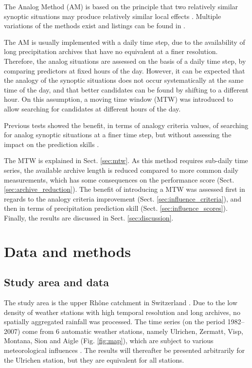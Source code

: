 \documentclass[hess, manuscript]{copernicus}
\begin{document}
\introduction  %
\label{sec:introduction}

The Analog Method (AM) is based on the principle that two relatively similar synoptic situations may produce relatively similar local effects \citep{Lorenz1956, Lorenz1969}. Multiple variations of the methods exist and listings can be found in \citet{BenDaoud2016}.

The AM is usually implemented with a daily time step, due to the availability of long precipitation archives that have no equivalent at a finer resolution. Therefore, the analog situations are assessed on the basis of a daily time step, by comparing predictors at fixed hours of the day. However, it can be expected that the analogy of the synoptic situations does not occur systematically at the same time of the day, and that better candidates can be found by shifting to a different hour. On this assumption, a moving time window (MTW) was introduced to allow searching for candidates at different hours of the day.

Previous tests showed the benefit, in terms of analogy criteria values, of searching for analog synoptic situations at a finer time step, but without assessing the impact on the prediction skills \citep{Finet2008}. 


The MTW is explained in Sect. \ref{sec:mtw}. As this method requires sub-daily time series, the available archive length is reduced compared to more common daily measurements, which has some consequences on the performance score (Sect. \ref{sec:archive_reduction}). The benefit of introducing a MTW was assessed first in regards to the analogy criteria improvement (Sect. \ref{sec:influence_criteria}), and then in terms of precipitation prediction skill (Sect. \ref{sec:influence_scores}). Finally, the results are discussed in Sect. \ref{sec:discussion}.



\section{Data and methods}

\subsection{Study area and data}
\label{sec:data}

The study area is the upper Rh\^{o}ne catchment in Switzerland \cite[see also][]{Horton2012a}. Due to the low density of weather stations with high temporal resolution and long archives, no spatially aggregated rainfall was processed. The time series (on the period 1982--2007) come from 6 automatic weather stations, namely Ulrichen, Zermatt, Visp, Montana, Sion and Aigle (Fig. \ref{fig:map}), which are subject to various meteorological influences \citep{Horton2012}. The results will thereafter be presented arbitrarily for the Ulrichen station, but they are equivalent for all stations.
\end{document}
